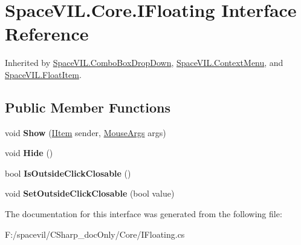 \hypertarget{interface_space_v_i_l_1_1_core_1_1_i_floating}{}\section{Space\+V\+I\+L.\+Core.\+I\+Floating Interface Reference}
\label{interface_space_v_i_l_1_1_core_1_1_i_floating}


Inherited by \mbox{\hyperlink{class_space_v_i_l_1_1_combo_box_drop_down}{Space\+V\+I\+L.\+Combo\+Box\+Drop\+Down}}, \mbox{\hyperlink{class_space_v_i_l_1_1_context_menu}{Space\+V\+I\+L.\+Context\+Menu}}, and \mbox{\hyperlink{class_space_v_i_l_1_1_float_item}{Space\+V\+I\+L.\+Float\+Item}}.

\subsection*{Public Member Functions}
\begin{DoxyCompactItemize}
\item 
\mbox{\label{interface_space_v_i_l_1_1_core_1_1_i_floating_a71315141109b37b0112fc9da3daa8078}} 
void {\bfseries Show} (\mbox{\hyperlink{interface_space_v_i_l_1_1_core_1_1_i_item}{I\+Item}} sender, \mbox{\hyperlink{class_space_v_i_l_1_1_core_1_1_mouse_args}{Mouse\+Args}} args)
\item 
\mbox{\label{interface_space_v_i_l_1_1_core_1_1_i_floating_acab7554a70314060a948d87259d2f6d5}} 
void {\bfseries Hide} ()
\item 
\mbox{\label{interface_space_v_i_l_1_1_core_1_1_i_floating_a8d016f661d0688f4f46334e4e8a8f286}} 
bool {\bfseries Is\+Outside\+Click\+Closable} ()
\item 
\mbox{\label{interface_space_v_i_l_1_1_core_1_1_i_floating_a9c7e51e01c96a82e7f5825986382b017}} 
void {\bfseries Set\+Outside\+Click\+Closable} (bool value)
\end{DoxyCompactItemize}


The documentation for this interface was generated from the following file\+:\begin{DoxyCompactItemize}
\item 
F\+:/spacevil/\+C\+Sharp\+\_\+doc\+Only/\+Core/I\+Floating.\+cs\end{DoxyCompactItemize}
